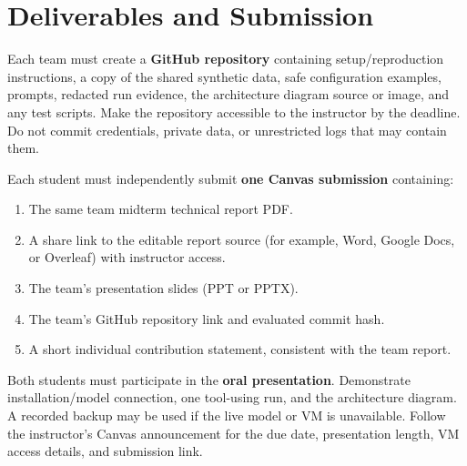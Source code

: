 \documentclass[11pt]{article}
\begin{document}
\section{Deliverables and Submission}
Each team must create a \textbf{GitHub repository} containing setup/reproduction instructions, a copy of the shared synthetic data, safe configuration examples, prompts, redacted run evidence, the architecture diagram source or image, and any test scripts. Make the repository accessible to the instructor by the deadline. Do not commit credentials, private data, or unrestricted logs that may contain them.

Each student must independently submit \textbf{one Canvas submission} containing:
\begin{enumerate}
  \item The same team midterm technical report PDF.
  \item A share link to the editable report source (for example, Word, Google Docs, or Overleaf) with instructor access.
  \item The team's presentation slides (PPT or PPTX).
  \item The team's GitHub repository link and evaluated commit hash.
  \item A short individual contribution statement, consistent with the team report.
\end{enumerate}
Both students must participate in the \textbf{oral presentation}. Demonstrate installation/model connection, one tool-using run, and the architecture diagram. A recorded backup may be used if the live model or VM is unavailable. Follow the instructor's Canvas announcement for the due date, presentation length, VM access details, and submission link.
\end{document}
